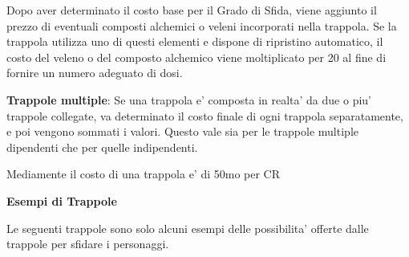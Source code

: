 \documentclass[a4paper,11pt,twoside,openany]{dndbook}
\begin{document}
Dopo aver determinato il costo base per il Grado di Sfida, viene aggiunto il prezzo di eventuali composti alchemici o veleni incorporati nella trappola. Se la trappola utilizza uno di questi elementi e dispone di ripristino automatico, il costo del veleno o del composto alchemico viene moltiplicato per 20 al fine di fornire un numero adeguato di dosi.

\textbf{Trappole multiple}: Se una trappola e' composta in realta' da due o piu' trappole collegate, va determinato il costo finale di ogni trappola separatamente, e poi vengono sommati i valori. Questo vale sia per le trappole multiple dipendenti che per quelle indipendenti.

Mediamente il costo di una trappola e' di 50mo per CR

\pagebreak

\textbf{Esempi di Trappole}

Le seguenti trappole sono solo alcuni esempi delle possibilita' offerte
dalle trappole per sfidare i personaggi.
\end{document}
